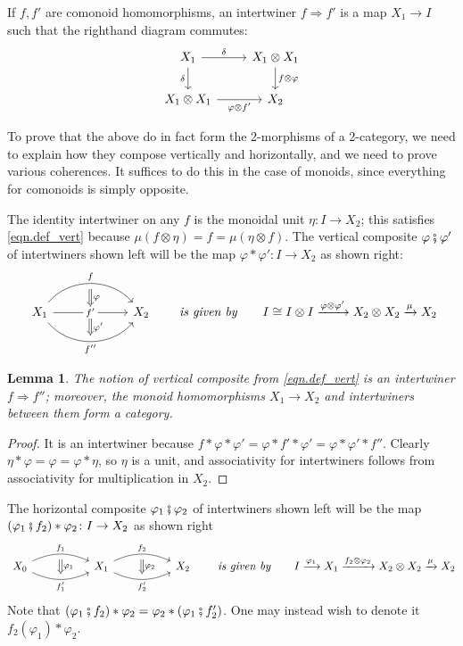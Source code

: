 \documentclass[11pt, one side, article]{memoir}
\theoremstyle{definition}
\theoremstyle{plain}
\newtheorem{lemma}[definitionx]{Lemma}
\newcommand{\then}{\mathbin{\fatsemi}}
\newcommand{\To}[2][]{\xrightarrow[#1]{#2}}
\newcommand{\imp}{\Rightarrow}
\newcommand{\tn}[1]{\textnormal{#1}}
\newcommand{\0}{\textsf{0}}
\newcommand{\1}{\tn{\textsf{1}}}
\newcommand{\hh}[2][]{#1 \tn{\textit{#2}} #1}
\newcommand{\qqby}{\hh[\qquad]{is given by}}
\begin{document}
If $f,f'$ are comonoid homomorphisms, an intertwiner $f\imp f'$ is a map $X_1\to I$ such that the righthand diagram commutes:
\[
\begin{tikzcd}
	X_1\ar[r, "\delta"]\ar[d, "\delta"']&
	X_1\otimes X_1\ar[d, "f\otimes\varphi"]\\
	X_1\otimes X_1\ar[r, "\varphi\otimes f'"']&
	X_2
\end{tikzcd}
\]

To prove that the above do in fact form the 2-morphisms of a 2-category, we need to explain how they compose vertically and horizontally, and we need to prove various coherences. It suffices to do this in the case of monoids, since everything for comonoids is simply opposite.

The identity intertwiner on any $f$ is the monoidal unit $\eta\colon I\to X_2$; this satisfies \eqref{eqn.def_vert} because $\mu(f\otimes\eta)=f=\mu(\eta\otimes f)$. The vertical composite $\varphi\then\varphi'$ of intertwiners shown left will be the map $\varphi*\varphi'\colon I\to X_2$ as shown right:
\begin{equation}\label{eqn.def_vert}
\begin{tikzcd}[column sep=60pt]
	X_1\ar[r, bend left=50pt, "f", ""' name=a]\ar[r, "f'" description, "" name=b1, ""' name=b2]\ar[r, bend right=50pt, "f''"', "" name=c]&
	X_2
	\ar[from=a, to=b1, Rightarrow, "\varphi"]
	\ar[from=b2, to=c, Rightarrow, "\varphi'"]
\end{tikzcd}
\qqby
	I\cong I\otimes I\To{\varphi\otimes\varphi'}X_2\otimes X_2\To{\mu}X_2
\end{equation}

\begin{lemma}
The notion of vertical composite from \eqref{eqn.def_vert} is an intertwiner $f\imp f''$; moreover, the monoid homomorphisms $X_1\to X_2$ and intertwiners between them form a category.
\end{lemma}
\begin{proof}
It is an intertwiner because $f*\varphi*\varphi'=\varphi*f'*\varphi'=\varphi*\varphi'*f''$. Clearly $\eta*\varphi=\varphi=\varphi*\eta$, so $\eta$ is a unit, and associativity for intertwiners follows from associativity for multiplication in $X_2$.
\end{proof}

The horizontal composite $\varphi_1\then\varphi_2$ of intertwiners shown left will be the map $(\varphi_1\then f_2)*\varphi_2\colon I\to X_2$ as shown right
\begin{equation}\label{eqn.def_hor}
\begin{tikzcd}[column sep=50pt]
	X_0\ar[r, bend left=25pt, "f_1", ""' name=a1]\ar[r, bend right=25pt, "f_1'"', "" name=b1]&
	X_1\ar[r, bend left=25pt, "f_2", ""' name=a2]\ar[r, bend right=25pt, "f_2'"', "" name=b2]&
	X_2
	\ar[from=a1, to=b1, Rightarrow, "\varphi_1"]
	\ar[from=a2, to=b2, Rightarrow, "\varphi_2"]
\end{tikzcd}
\qqby
I\To{\varphi_1}X_1\To{f_2\otimes\varphi_2}X_2\otimes X_2\To{\mu}X_2
\end{equation}
Note that $(\varphi_1\then f_2)*\varphi_2=\varphi_2*(\varphi_1\then f_2')$. One may instead wish to denote it $f_2(\varphi_1)*\varphi_2$. 
\end{document}
